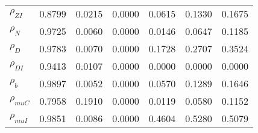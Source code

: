 \begin{center}
\begin{longtable}{lcccccc}
$ {\rho_{ZI}}          $	 & 	          0.8799	 & 	          0.0215	 & 	          0.0000	 & 	          0.0615	 & 	          0.1330	 & 	          0.1675 \\ 
$ {\rho_N}             $	 & 	          0.9725	 & 	          0.0060	 & 	          0.0000	 & 	          0.0146	 & 	          0.0647	 & 	          0.1185 \\ 
$ {\rho_D}             $	 & 	          0.9783	 & 	          0.0070	 & 	          0.0000	 & 	          0.1728	 & 	          0.2707	 & 	          0.3524 \\ 
$ {\rho_{DI}}          $	 & 	          0.9413	 & 	          0.0107	 & 	          0.0000	 & 	          0.0000	 & 	          0.0000	 & 	          0.0000 \\ 
$ {\rho_b}             $	 & 	          0.9897	 & 	          0.0052	 & 	          0.0000	 & 	          0.0570	 & 	          0.1289	 & 	          0.1646 \\ 
$ {\rho_{muC}}         $	 & 	          0.7958	 & 	          0.1910	 & 	          0.0000	 & 	          0.0119	 & 	          0.0580	 & 	          0.1152 \\ 
$ {\rho_{muI}}         $	 & 	          0.9851	 & 	          0.0086	 & 	          0.0000	 & 	          0.4604	 & 	          0.5280	 & 	          0.5079 \\ 
\end{longtable}
 \end{center}
